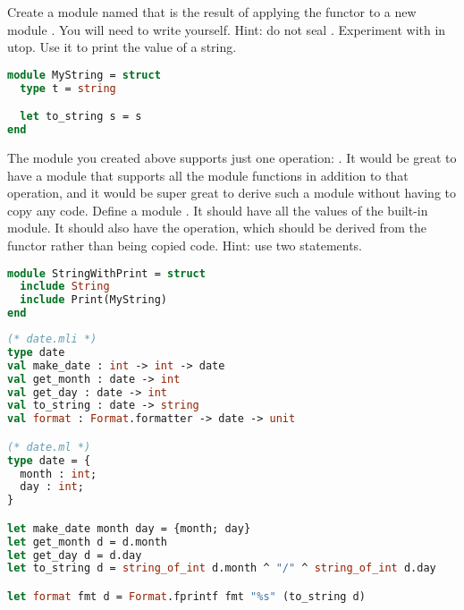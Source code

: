 Create a module named  that is the result of applying the functor  to a new module . You will need to write  yourself. Hint: do not seal .
Experiment with  in utop. Use it to print the value of a string.

\begin{lstlisting}[language=OCaml]
module MyString = struct
  type t = string

  let to_string s = s
end
\end{lstlisting}

The  module you created above supports just one operation: . It would be great to have a module that supports all the  module functions in addition to that  operation, and it would be super great to derive such a module without having to copy any code.
Define a module . It should have all the values of the built-in  module. It should also have the  operation, which should be derived from the  functor rather than being copied code. Hint: use two  statements.

\begin{lstlisting}[language=OCaml]
module StringWithPrint = struct
  include String
  include Print(MyString)
end
\end{lstlisting}

\problem[date]
\begin{lstlisting}[language=OCaml]
(* date.mli *)
type date
val make_date : int -> int -> date
val get_month : date -> int
val get_day : date -> int
val to_string : date -> string
val format : Format.formatter -> date -> unit

(* date.ml *)
type date = {
  month : int;
  day : int;
}

let make_date month day = {month; day}
let get_month d = d.month
let get_day d = d.day
let to_string d = string_of_int d.month ^ "/" ^ string_of_int d.day

let format fmt d = Format.fprintf fmt "%s" (to_string d)
\end{lstlisting}

